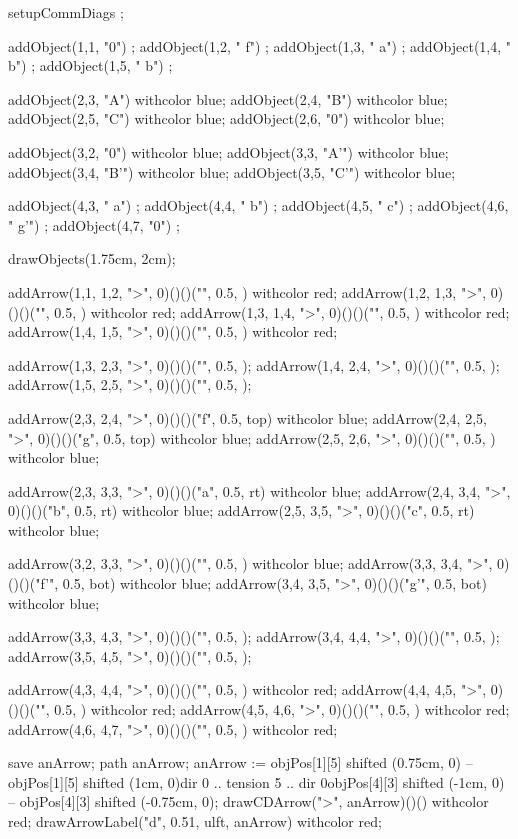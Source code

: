 \startbuffer
\startformula{}
  setupCommDiags ;
  
  addObject(1,1, "0") ;
  addObject(1,2, "\; f") ;
  addObject(1,3, "\: a") ;
  addObject(1,4, "\: b") ;
  addObject(1,5, "\: b") ;

  addObject(2,3, "A") withcolor blue;
  addObject(2,4, "B") withcolor blue;
  addObject(2,5, "C") withcolor blue;
  addObject(2,6, "0") withcolor blue;
  
  addObject(3,2, "0")  withcolor blue;
  addObject(3,3, "A'") withcolor blue;
  addObject(3,4, "B'") withcolor blue;
  addObject(3,5, "C'") withcolor blue;

  addObject(4,3, "\: a") ;
  addObject(4,4, "\: b") ;
  addObject(4,5, "\: c") ;
  addObject(4,6, "\: g'") ;
  addObject(4,7, "0") ;
    
  drawObjects(1.75cm, 2cm);
  
  addArrow(1,1, 1,2, ">", 0)()()("", 0.5, ) withcolor red;
  addArrow(1,2, 1,3, ">", 0)()()("", 0.5, ) withcolor red;
  addArrow(1,3, 1,4, ">", 0)()()("", 0.5, ) withcolor red;
  addArrow(1,4, 1,5, ">", 0)()()("", 0.5, ) withcolor red;
  
  addArrow(1,3, 2,3, ">", 0)()()("", 0.5, );
  addArrow(1,4, 2,4, ">", 0)()()("", 0.5, );
  addArrow(1,5, 2,5, ">", 0)()()("", 0.5, );
  
  addArrow(2,3, 2,4, ">", 0)()()("f", 0.5, top) withcolor blue;
  addArrow(2,4, 2,5, ">", 0)()()("g", 0.5, top) withcolor blue;
  addArrow(2,5, 2,6, ">", 0)()()("", 0.5, ) withcolor blue;

  addArrow(2,3, 3,3, ">", 0)()()("a", 0.5, rt) withcolor blue;
  addArrow(2,4, 3,4, ">", 0)()()("b", 0.5, rt) withcolor blue;
  addArrow(2,5, 3,5, ">", 0)()()("c", 0.5, rt) withcolor blue;

  addArrow(3,2, 3,3, ">", 0)()()("", 0.5, ) withcolor blue;
  addArrow(3,3, 3,4, ">", 0)()()("f'", 0.5, bot) withcolor blue;
  addArrow(3,4, 3,5, ">", 0)()()("g'", 0.5, bot) withcolor blue;

  addArrow(3,3, 4,3, ">", 0)()()("", 0.5, );
  addArrow(3,4, 4,4, ">", 0)()()("", 0.5, );
  addArrow(3,5, 4,5, ">", 0)()()("", 0.5, );
  
  addArrow(4,3, 4,4, ">", 0)()()("", 0.5, ) withcolor red;
  addArrow(4,4, 4,5, ">", 0)()()("", 0.5, ) withcolor red;
  addArrow(4,5, 4,6, ">", 0)()()("", 0.5, ) withcolor red;
  addArrow(4,6, 4,7, ">", 0)()()("", 0.5, ) withcolor red;
 
  save anArrow; path anArrow;
  anArrow := 
    objPos[1][5] shifted (0.75cm, 0) --
    objPos[1][5] shifted (1cm, 0){dir 0} ..
    tension 5 ..
    {dir 0}objPos[4][3] shifted (-1cm, 0) -- 
    objPos[4][3] shifted (-0.75cm, 0);
  drawCDArrow(">", anArrow)()() withcolor red;
  drawArrowLabel("d", 0.51, ulft, anArrow) withcolor red;

\stopMPcode\stopformula
\stopbuffer

\processTEXbuffer

\typebuffer

\stopchapter 